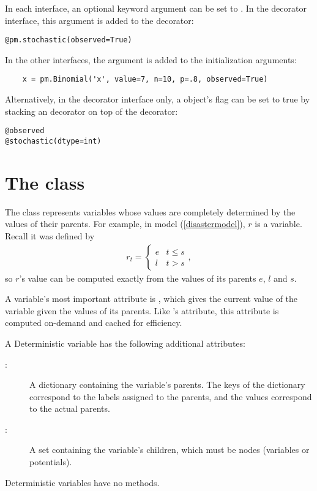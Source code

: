 In each interface, an optional keyword argument  can be set to . In the decorator interface, this argument is added to the  decorator:

\begin{verbatim}
@pm.stochastic(observed=True)
\end{verbatim}

In the other interfaces, the  argument is added to the initialization arguments:

\begin{verbatim}
	x = pm.Binomial('x', value=7, n=10, p=.8, observed=True)
\end{verbatim}

Alternatively, in the decorator interface only, a  object's  flag can be set to true by stacking an  decorator on top of the  decorator:
\begin{verbatim}
@observed
@stochastic(dtype=int)
\end{verbatim}


\section[The Deterministic class]{The  class}
\label{deterministic}


The  class represents variables whose values are completely determined by the values of their parents. For example, in model (\ref{disastermodel}), $r$ is a  variable. Recall it was defined by
\begin{eqnarray*}
    r_t=\left\{\begin{array}{ll}
        e & t\le s\\ l & t>s
        \end{array}\right.,
\end{eqnarray*}
so $r$'s value can be computed exactly from the values of its parents $e$, $l$ and $s$.

A  variable's most important attribute is , which gives the current value of the variable given the values of its parents. Like 's  attribute, this attribute is computed on-demand and cached for efficiency.

A Deterministic variable has the following additional attributes:
\begin{description}
    \item[:] A dictionary containing the variable's parents. The keys of the dictionary correspond to the labels assigned to the parents, and the values correspond to the actual parents.
    \item[:] A set containing the variable's children, which must be nodes (variables or potentials).
\end{description}
Deterministic variables have no methods.


